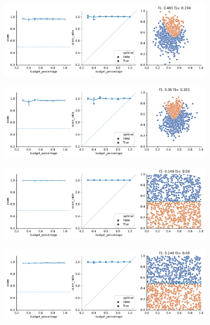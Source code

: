 \begin{figure}
\begin{subfigure}{.5\textwidth}
    \end{subfigure}%
    \begin{subfigure}{.5\textwidth}
        \centering
        \includegraphics[width=\textwidth]{img/2d/4.pdf}
    \end{subfigure}%
    \hfill
    \begin{subfigure}{.5\textwidth}
        \centering
        \includegraphics[width=\textwidth]{img/2d/5.pdf}
    \end{subfigure}%
    \begin{subfigure}{.5\textwidth}
        \centering
        \includegraphics[width=\textwidth]{img/2d/6.pdf}
    \end{subfigure}%
    \hfill
    \begin{subfigure}{.5\textwidth}
        \centering
        \includegraphics[width=\textwidth]{img/2d/7.pdf}

\end{subfigure}
\end{figure}
